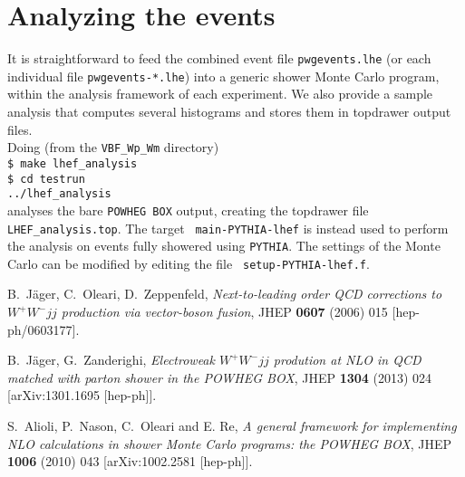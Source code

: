 \documentclass[a4paper,11pt]{article}
\begin{document}
\section*{Analyzing the events}
%
It is straightforward to feed the combined event file {\tt pwgevents.lhe} (or each individual file {\tt pwgevents-*.lhe}) into a generic
shower Monte Carlo program, within the analysis framework of each
experiment. We also provide a sample analysis that computes several
histograms and stores them in topdrawer output files.
\\[2ex]
Doing (from the {\tt VBF\_Wp\_Wm} directory)
\\[2ex]
{\tt \$ make lhef\_analysis}
\\[2ex]
{\tt \$ cd testrun}
\\[2ex]
{\tt ../lhef\_analysis}
\\[2ex]
analyses the bare {\tt POWHEG BOX} output, creating the topdrawer file
{\tt LHEF\_analysis.top}. The target {\tt
  main-PYTHIA-lhef} is instead used to perform the analysis on events
fully showered using  {\tt PYTHIA}. The settings of
the Monte Carlo can be modified by editing the file {\tt
  setup-PYTHIA-lhef.f}. 
%

%
\begin{thebibliography}{99}
 B.~J\"ager, C.~Oleari, D.~Zeppenfeld, {\em
    Next-to-leading order QCD corrections to $W^+W^-jj$ 
    production via vector-boson fusion},  JHEP {\bf 0607} (2006)
  015  [hep-ph/0603177].

 B.~J\"ager, G.~Zanderighi, {\em Electroweak $W^+W^-jj$ prodution at
  NLO in QCD matched with parton shower in the POWHEG BOX},  JHEP {\bf 1304} (2013)
  024  [arXiv:1301.1695 [hep-ph]].
  
 S.~Alioli, P.~Nason, C.~Oleari and E. Re, {\em
    A general framework for implementing NLO calculations in shower
    Monte Carlo programs: the POWHEG BOX}, JHEP {\bf 1006} (2010)
  043  [arXiv:1002.2581 [hep-ph]].

\end{thebibliography}
\end{document}
